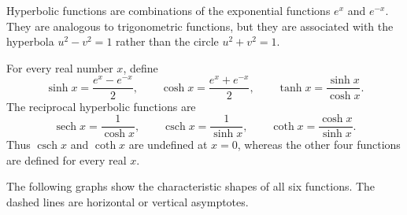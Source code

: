 \providecommand{\sech}{\operatorname{sech}}
\providecommand{\csch}{\operatorname{csch}}
\providecommand{\arsinh}{\operatorname{arsinh}}
\providecommand{\arcosh}{\operatorname{arcosh}}
\providecommand{\artanh}{\operatorname{artanh}}
\providecommand{\arcoth}{\operatorname{arcoth}}
\providecommand{\arsech}{\operatorname{arsech}}
\providecommand{\arcsch}{\operatorname{arcsch}}

Hyperbolic functions are combinations of the exponential functions
\(e^x\) and \(e^{-x}\).  They are analogous to trigonometric functions,
but they are associated with the hyperbola \(u^2-v^2=1\) rather than the
circle \(u^2+v^2=1\).

\begin{definition}
    For every real number \(x\), define
    \[
        \sinh x=\frac{e^x-e^{-x}}{2},
        \qquad
        \cosh x=\frac{e^x+e^{-x}}{2},
        \qquad
        \tanh x=\frac{\sinh x}{\cosh x}.
    \]
    The reciprocal hyperbolic functions are
    \[
        \sech x=\frac{1}{\cosh x},
        \qquad
        \csch x=\frac{1}{\sinh x},
        \qquad
        \coth x=\frac{\cosh x}{\sinh x}.
    \]
    Thus \(\csch x\) and \(\coth x\) are undefined at \(x=0\), whereas
    the other four functions are defined for every real \(x\).
\end{definition}

The following graphs show the characteristic shapes of all six functions.
The dashed lines are horizontal or vertical asymptotes.

